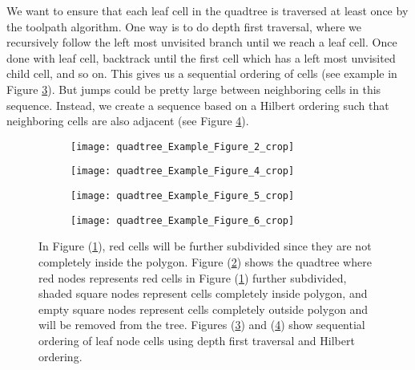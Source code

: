 We want to ensure that each leaf cell in the quadtree is traversed at least once by the toolpath algorithm.
One way is to do depth first traversal, where we recursively follow the left most unvisited branch until we reach a leaf cell.
Once done with leaf cell, backtrack until the first cell which has a left most unvisited child cell, and so on.
This gives us a sequential ordering of cells (see example in Figure \ref{fig:quadtree_example_combinec}).
But jumps could be pretty large between neighboring cells in this sequence.
Instead, we create a sequence based on a Hilbert ordering such that neighboring cells are also adjacent (see Figure \ref{fig:quadtree_example_combined}).

\begin{figure}[htp!] 
  \centering
  \begin{subfigure}[t]{2.5in}
    \hspace*{-0.15in}
    \texttt{[image: quadtree\_Example\_Figure\_2\_crop]}
    \caption{\label{fig:quadtree_example_combinea}}
    \medskip
  \end{subfigure}
  \begin{subfigure}[t]{2.5in}
    \hspace*{-0.1in}
    \texttt{[image: quadtree\_Example\_Figure\_4\_crop]}
    \caption{\label{fig:quadtree_example_combineb}}
    \medskip
  \end{subfigure}
  \begin{subfigure}[t]{2.5in}
    \hspace*{-0.15in}
    \texttt{[image: quadtree\_Example\_Figure\_5\_crop]}
    \caption{\label{fig:quadtree_example_combinec}}
  \end{subfigure}
  \begin{subfigure}[t]{2.5in}
    \centering
    \texttt{[image: quadtree\_Example\_Figure\_6\_crop]}
    \caption{\label{fig:quadtree_example_combined}}
  \end{subfigure}
  \medskip
  \caption{\label{fig:quadtree_example_combine}
    In Figure (\ref{fig:quadtree_example_combinea}), red cells will be further subdivided since they are not completely inside the polygon.
    Figure (\ref{fig:quadtree_example_combineb}) shows the quadtree where red nodes represents red cells in Figure (\ref{fig:quadtree_example_combinea}) further subdivided, shaded square nodes represent cells completely inside polygon, and empty square nodes represent cells completely outside polygon and will be removed from the tree.
    Figures (\ref{fig:quadtree_example_combinec}) and (\ref{fig:quadtree_example_combined}) show sequential ordering of leaf node cells using depth first traversal and Hilbert ordering.
  }  	
\end{figure}
